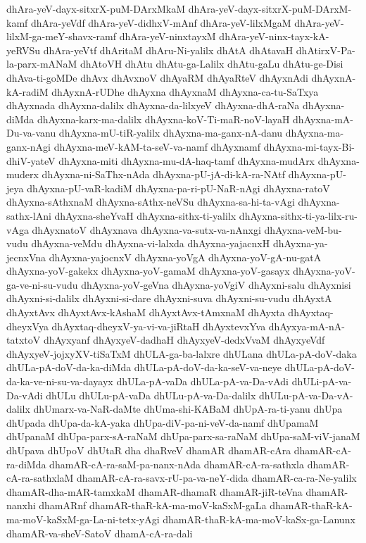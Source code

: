 {dhAra-yeV-dayx-sitxrX-puM-DArxMkaM
dhAra-yeV-dayx-sitxrX-puM-DArxM-kamf
dhAra-yeVdf
dhAra-yeV-didhxV-mAnf
dhAra-yeV-lilxMgaM
dhAra-yeV-lilxM-ga-meY-shavx-ramf
dhAra-yeV-ninxtayxM
dhAra-yeV-ninx-tayx-kA-yeRVSu
dhAra-yeVtf
dhAritaM
dhAru-Ni-yalilx
dhAtA
dhAtavaH
dhAtirxV-Pa-la-parx-mANaM
dhAtoVH
dhAtu
dhAtu-ga-Lalilx
dhAtu-gaLu
dhAtu-ge-Disi
dhAva-ti-goMDe
dhAvx
dhAvxnoV
dhAyaRM
dhAyaRteV
dhAyxnAdi
dhAyxnA-kA-radiM
dhAyxnA-rUDhe
dhAyxna
dhAyxnaM
dhAyxna-ca-tu-SaTxya
dhAyxnada
dhAyxna-dalilx
dhAyxna-da-lilxyeV
dhAyxna-dhA-raNa
dhAyxna-diMda
dhAyxna-karx-ma-dalilx
dhAyxna-koV-Ti-maR-noV-layaH
dhAyxna-mA-Du-va-vanu
dhAyxna-mU-tiR-yalilx
dhAyxna-ma-ganx-nA-danu
dhAyxna-ma-ganx-nAgi
dhAyxna-meV-kAM-ta-seV-va-namf
dhAyxnamf
dhAyxna-mi-tayx-Bi-dhiV-yateV
dhAyxna-miti
dhAyxna-mu-dA-haq-tamf
dhAyxna-mudArx
dhAyxna-muderx
dhAyxna-ni-SaThx-nAda
dhAyxna-pU-jA-di-kA-ra-NAtf
dhAyxna-pU-jeya
dhAyxna-pU-vaR-kadiM
dhAyxna-pa-ri-pU-NaR-nAgi
dhAyxna-ratoV
dhAyxna-sAthxnaM
dhAyxna-sAthx-neVSu
dhAyxna-sa-hi-ta-vAgi
dhAyxna-sathx-lAni
dhAyxna-sheYvaH
dhAyxna-sithx-ti-yalilx
dhAyxna-sithx-ti-ya-lilx-ru-vAga
dhAyxnatoV
dhAyxnava
dhAyxna-va-sutx-va-nAnxgi
dhAyxna-veM-bu-vudu
dhAyxna-veMdu
dhAyxna-vi-lalxda
dhAyxna-yajacnxH
dhAyxna-ya-jecnxVna
dhAyxna-yajocnxV
dhAyxna-yoVgA
dhAyxna-yoV-gA-nu-gatA
dhAyxna-yoV-gakekx
dhAyxna-yoV-gamaM
dhAyxna-yoV-gasayx
dhAyxna-yoV-ga-ve-ni-su-vudu
dhAyxna-yoV-geVna
dhAyxna-yoVgiV
dhAyxni-salu
dhAyxnisi
dhAyxni-si-dalilx
dhAyxni-si-dare
dhAyxni-suva
dhAyxni-su-vudu
dhAyxtA
dhAyxtAvx
dhAyxtAvx-kAshaM
dhAyxtAvx-tAmxnaM
dhAyxta
dhAyxtaq-dheyxVya
dhAyxtaq-dheyxV-ya-vi-va-jiRtaH
dhAyxtevxYva
dhAyxya-mA-nA-tatxtoV
dhAyxyanf
dhAyxyeV-dadhaH
dhAyxyeV-dedxVvaM
dhAyxyeVdf
dhAyxyeV-jojxyXV-tiSaTxM
dhULA-ga-ba-lalxre
dhULana
dhULa-pA-doV-daka
dhULa-pA-doV-da-ka-diMda
dhULa-pA-doV-da-ka-seV-va-neye
dhULa-pA-doV-da-ka-ve-ni-su-va-dayayx
dhULa-pA-vaDa
dhULa-pA-va-Da-vAdi
dhULi-pA-va-Da-vAdi
dhULu
dhULu-pA-vaDa
dhULu-pA-va-Da-dalilx
dhULu-pA-va-Da-vA-dalilx
dhUmarx-va-NaR-daMte
dhUma-shi-KABaM
dhUpA-ra-ti-yanu
dhUpa
dhUpada
dhUpa-da-kA-yaka
dhUpa-diV-pa-ni-veV-da-namf
dhUpamaM
dhUpanaM
dhUpa-parx-sA-raNaM
dhUpa-parx-sa-raNaM
dhUpa-saM-viV-janaM
dhUpava
dhUpoV
dhUtaR
dha
dhaRveV
dhamAR
dhamAR-cAra
dhamAR-cA-ra-diMda
dhamAR-cA-ra-saM-pa-nanx-nAda
dhamAR-cA-ra-sathxla
dhamAR-cA-ra-sathxlaM
dhamAR-cA-ra-savx-rU-pa-va-neY-dida
dhamAR-ca-ra-Ne-yalilx
dhamAR-dha-mAR-tamxkaM
dhamAR-dhamaR
dhamAR-jiR-teVna
dhamAR-nanxhi
dhamARnf
dhamAR-thaR-kA-ma-moV-kaSxM-gaLa
dhamAR-thaR-kA-ma-moV-kaSxM-ga-La-ni-tetx-yAgi
dhamAR-thaR-kA-ma-moV-kaSx-ga-Lanunx
dhamAR-va-sheV-SatoV
dhamA-cA-ra-dali
}
